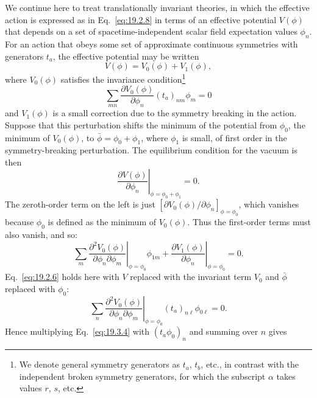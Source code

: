 We continue here to treat translationally invariant theories, in which the effective action is expressed as in Eq.~\eqref{eq:19.2.8} in terms of an effective potential $V(\phi)$ that depends on a set of spacetime-independent scalar field expectation values $\phi_n$. For an action that obeys some set of approximate continuous symmetries with generators $t_a$, the effective potential may be written
\begin{equation}
V(\phi)=V_0(\phi)+V_1(\phi),
\tag{19.3.1}\label{eq:19.3.1}
\end{equation}
where $V_0(\phi)$ satisfies the invariance condition\footnote{We denote general symmetry generators as $t_a$, $t_b$, etc., in contrast with the independent broken symmetry generators, for which the subscript $\alpha$ takes values $r$, $s$, etc.}
\begin{equation}
\sum_{mn}\frac{\partial V_0(\phi)}{\partial\phi_n}(t_a)_{nm}\phi_m=0
\tag{19.3.2}\label{eq:19.3.2}
\end{equation}
and $V_1(\phi)$ is a small correction due to the symmetry breaking in the action. Suppose that this perturbation shifts the minimum of the potential from $\phi_0$, the minimum of $V_0(\phi)$, to $\bar\phi=\phi_0+\phi_1$, where $\phi_1$ is small, of first order in the symmetry-breaking perturbation. The equilibrium condition for the vacuum is then
\begin{equation}
\left.\frac{\partial V(\phi)}{\partial\phi_n}\right|_{\phi=\phi_0+\phi_1}=0.
\tag{19.3.3}\label{eq:19.3.3}
\end{equation}
The zeroth-order term on the left is just
$[\partial V_0(\phi)/\partial\phi_n]_{\phi=\phi_0}$, which vanishes because $\phi_0$ is defined as the minimum of $V_0(\phi)$. Thus the first-order terms must also vanish, and so:
\begin{equation}
\left.\sum_m\frac{\partial^2 V_0(\phi)}
{\partial\phi_n\partial\phi_m}\right|_{\phi=\phi_0}\phi_{1m}
+\left.\frac{\partial V_1(\phi)}{\partial\phi_n}\right|_{\phi=\phi_0}=0.
\tag{19.3.4}\label{eq:19.3.4}
\end{equation}
Eq.~\eqref{eq:19.2.6} holds here with $V$ replaced with the invariant term $V_0$ and $\bar\phi$ replaced with $\phi_0$:
\begin{equation}
\left.\sum_n\frac{\partial^2 V_0(\phi)}
{\partial\phi_n\partial\phi_m}\right|_{\phi=\phi_0}
(t_a)_{n\ell}\phi_{0\ell}=0.
\tag{19.3.5}\label{eq:19.3.5}
\end{equation}
Hence multiplying Eq.~\eqref{eq:19.3.4} with $(t_a\phi_0)_n$ and summing over $n$ gives
